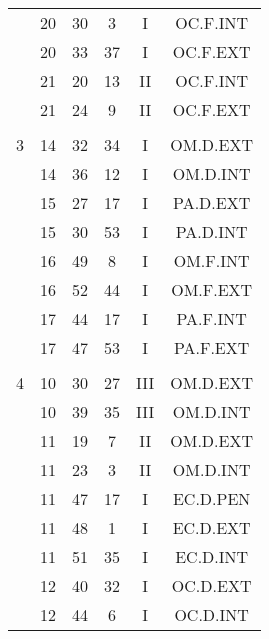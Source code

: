 \documentclass[12pt, a4paper]{article}
\begin{document}
\begin{multicols}{3}
{\begin{tabular}{c c c c c c}
	 	 	 	 & 20 & 30 & 3 & I & OC.F.INT\\%
	 	 	 	 & 20 & 33 & 37 & I & OC.F.EXT\\%
	 	 	 	 & 21 & 20 & 13 & II & OC.F.INT\\%
	 	 	 	 & 21 & 24 & 9 & II & OC.F.EXT\\%
	 	 	 	 & & & & & \\%
	 	 	 	3 & 14 & 32 & 34 & I & OM.D.EXT\\%
	 	 	 	 & 14 & 36 & 12 & I & OM.D.INT\\%
	 	 	 	 & 15 & 27 & 17 & I & PA.D.EXT\\%
	 	 	 	 & 15 & 30 & 53 & I & PA.D.INT\\%
	 	 	 	 & 16 & 49 & 8 & I & OM.F.INT\\%
	 	 	 	 & 16 & 52 & 44 & I & OM.F.EXT\\%
	 	 	 	 & 17 & 44 & 17 & I & PA.F.INT\\%
	 	 	 	 & 17 & 47 & 53 & I & PA.F.EXT\\%
	 	 	 	 & & & & & \\%
	 	 	 	4 & 10 & 30 & 27 & III & OM.D.EXT\\%
	 	 	 	 & 10 & 39 & 35 & III & OM.D.INT\\%
	 	 	 	 & 11 & 19 & 7 & II & OM.D.EXT\\%
	 	 	 	 & 11 & 23 & 3 & II & OM.D.INT\\%
	 	 	 	 & 11 & 47 & 17 & I & EC.D.PEN\\%
	 	 	 	 & 11 & 48 & 1 & I & EC.D.EXT\\%
	 	 	 	 & 11 & 51 & 35 & I & EC.D.INT\\%
	 	 	 	 & 12 & 40 & 32 & I & OC.D.EXT\\%
	 	 	 	 & 12 & 44 & 6 & I & OC.D.INT\\%

\end{tabular}}
\end{multicols}
\end{document}
